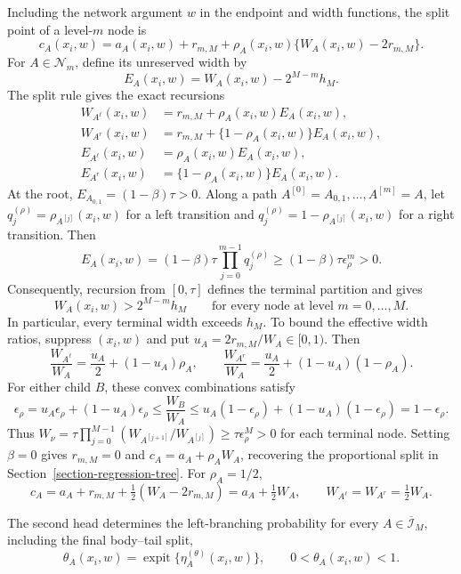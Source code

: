 \documentclass[11pt]{article}
\numberwithin{equation}{section}
\begin{document}
Including the network argument $w$ in the endpoint and width functions, the split point of a level-$m$ node is
\begin{equation}
    c_A(x_i,w)=a_A(x_i,w)+r_{m,M}
      +\rho_A(x_i,w)\{W_A(x_i,w)-2r_{m,M}\}.
    \label{eq:general-tree-cut}
\end{equation}
For $A\in\mathcal N_m$, define its unreserved width by
\[
    E_A(x_i,w)=W_A(x_i,w)-2^{M-m}h_M.
\]
The split rule gives the exact recursions
\begin{align*}
    W_{A^\ell}(x_i,w)&=r_{m,M}+\rho_A(x_i,w)E_A(x_i,w),\\
    W_{A^r}(x_i,w)&=r_{m,M}+\{1-\rho_A(x_i,w)\}E_A(x_i,w),\\
    E_{A^\ell}(x_i,w)&=\rho_A(x_i,w)E_A(x_i,w),\\
    E_{A^r}(x_i,w)&=\{1-\rho_A(x_i,w)\}E_A(x_i,w).
\end{align*}
At the root, $E_{A_{0,1}}=(1-\beta)\tau>0$. Along a path $A^{[0]}=A_{0,1},\ldots,A^{[m]}=A$, let $q_j^{(\rho)}=\rho_{A^{[j]}}(x_i,w)$ for a left transition and $q_j^{(\rho)}=1-\rho_{A^{[j]}}(x_i,w)$ for a right transition. Then
\[
    E_A(x_i,w)=(1-\beta)\tau\prod_{j=0}^{m-1}q_j^{(\rho)}
       \geq(1-\beta)\tau\epsilon_\rho^m>0.
\]
Consequently, recursion from $[0,\tau]$ defines the terminal partition and gives
\begin{equation}
    W_A(x_i,w)>2^{M-m}h_M
    \qquad\text{for every node at level }m=0,\ldots,M.
    \label{eq:reservation-invariant}
\end{equation}
In particular, every terminal width exceeds $h_M$. To bound the effective width ratios, suppress $(x_i,w)$ and put $u_A=2r_{m,M}/W_A\in[0,1)$. Then
\[
    \frac{W_{A^\ell}}{W_A}=\frac{u_A}{2}+(1-u_A)\rho_A,
    \qquad
    \frac{W_{A^r}}{W_A}=\frac{u_A}{2}+(1-u_A)(1-\rho_A).
\]
For either child $B$, these convex combinations satisfy
\[
    \epsilon_\rho
    =u_A\epsilon_\rho+(1-u_A)\epsilon_\rho
    \leq\frac{W_B}{W_A}
    \leq u_A(1-\epsilon_\rho)+(1-u_A)(1-\epsilon_\rho)
    =1-\epsilon_\rho.
\]
Thus $W_\nu=\tau\prod_{j=0}^{M-1}(W_{A^{[j+1]}}/W_{A^{[j]}})\geq\tau\epsilon_\rho^M>0$ for each terminal node. Setting $\beta=0$ gives $r_{m,M}=0$ and $c_A=a_A+\rho_AW_A$, recovering the proportional split in Section~\ref{section-regression-tree}. For $\rho_A=1/2$,
\[
    c_A=a_A+r_{m,M}+\tfrac12(W_A-2r_{m,M})
       =a_A+\tfrac12W_A,\qquad
    W_{A^\ell}=W_{A^r}=\tfrac12W_A.
\]

The second head determines the left-branching probability for every $A\in\overline{\mathcal I}_M$, including the final body--tail split,
\begin{equation}
    \label{eq:branch_prob}
    \theta_A(x_i,w)
    =
    \operatorname{expit}\{\eta_A^{(\theta)}(x_i,w)\},
    \qquad 0<\theta_A(x_i,w)<1.
\end{equation}
\end{document}
